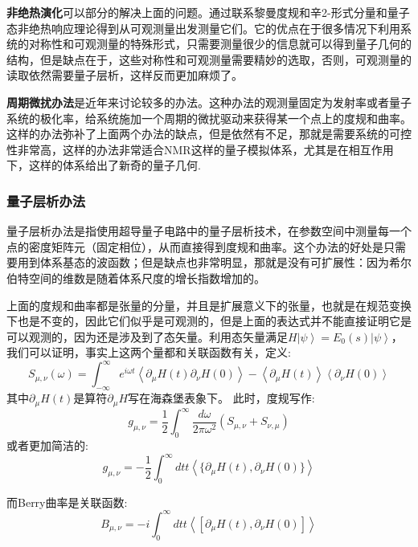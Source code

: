 \documentclass[supercite]{HustGraduPaper}
\newcommand{\ket}[1]{\left| #1 \right\rangle}
\newcommand{\avg}[1]{\left\langle #1 \right\rangle}
\begin{document}
   \textbf{非绝热演化}可以部分的解决上面的问题\cite{kolodrubetz2017geometry}。通过联系黎曼度规和辛2-形式分量和量子态非绝热响应理论得到从可观测量出发测量它们。它的优点在于很多情况下利用系统的对称性和可观测量的特殊形式，只需要测量很少的信息就可以得到量子几何的结构，但是缺点在于，这些对称性和可观测量需要精妙的选取，否则，可观测量的读取依然需要量子层析，这样反而更加麻烦了。
   
   \textbf{周期微扰办法}是近年来讨论较多的办法\cite{palumbo2018revealing,ozawa2018extracting,yu2018experimental}。这种办法的观测量固定为发射率或者量子系统的极化率，给系统施加一个周期的微扰驱动来获得某一个点上的度规和曲率。这样的办法弥补了上面两个办法的缺点，但是依然有不足，那就是需要系统的可控性非常高，这样的办法非常适合NMR这样的量子模拟体系，尤其是在相互作用下，这样的体系给出了新奇的量子几何\cite{Qihaotomography}. 
   
   
   \subsubsection{量子层析办法}
    量子层析办法是指使用超导量子电路中的量子层析技术，在参数空间中测量每一个点的密度矩阵元（固定相位），从而直接得到度规和曲率。这个办法的好处是只需要用到体系基态的波函数；但是缺点也非常明显，那就是没有可扩展性：因为希尔伯特空间的维数是随着体系尺度的增长指数增加的。
    

上面的度规和曲率都是张量的分量，并且是扩展意义下的张量，也就是在规范变换下也是不变的，因此它们似乎是可观测的，但是上面的表达式并不能直接证明它是可以观测的，因为还是涉及到了态矢量。利用态矢量满足$H\ket{\psi} = E_0(s)\ket{\psi}$，我们可以证明，事实上这两个量都和关联函数有关，定义:
\begin{equation}
S_{\mu,\nu}(\omega) = \int_{-\infty}^\infty e^{i\omega t}\avg{\partial_\mu H(t)\partial_\nu H(0)} - \avg{\partial_\mu H(t)}\avg{\partial_\nu H(0)}
\end{equation}
其中$\partial_\mu H(t)$是算符$\partial_\mu H$写在海森堡表象下。
此时，度规写作:
\begin{equation}
g_{\mu,\nu} = \frac{1}{2}\int_0^{\infty} \frac{d\omega}{2\pi \omega^2}(S_{\mu,\nu} + S_{\nu,\mu})
\end{equation}
或者更加简洁的:
\begin{equation}
g_{\mu,\nu} = -\frac{1}{2} \int_0^\infty dt t \avg{\{\partial_\mu H(t), \partial_\nu H(0)\}}
\end{equation}


而Berry曲率是关联函数:
\begin{equation}
B_{\mu,\nu} = -i\int_0^\infty dt t\avg{[\partial_\mu H(t),\partial_\nu H(0)]}
\end{equation}
\end{document}
